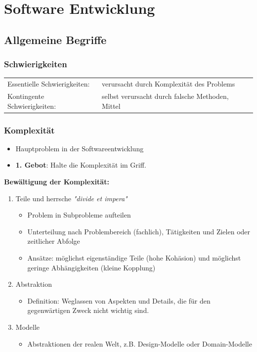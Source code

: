 \section{Software Entwicklung}

\subsection{Allgemeine Begriffe}
\subsubsection{Schwierigkeiten}
	\begin{tabular}{ll}
	Essentielle Schwierigkeiten: & verursacht durch Komplexität des Problems \\
	Kontingente Schwierigkeiten: & selbst verursacht durch falsche Methoden, Mittel\\
	\end{tabular}
	
\subsubsection{Komplexität}
	\begin{itemize}
		\item Hauptproblem in der Softwareentwicklung
		\item \textbf{1. Gebot}: Halte die Komplexität im Griff.
	\end{itemize}
	
	\textbf{Bewältigung der Komplexität:}
		\begin{enumerate}
			\item Teile und herrsche \textit{"divide et impera"}
					\begin{itemize}
						\item Problem in Subprobleme aufteilen
						\item Unterteilung nach Problembereich (fachlich), Tätigkeiten und Zielen oder zeitlicher Abfolge
						\item Ansätze: möglichst eigenständige Teile (hohe Kohäsion) und möglichst geringe Abhängigkeiten (kleine Kopplung)
					\end{itemize}
			\item Abstraktion
					\begin{itemize}
						\item Definition: Weglassen von Aspekten und Details, die für den gegenwärtigen Zweck nicht wichtig sind.
					\end{itemize}
			\item Modelle
					\begin{itemize}
						\item Abstraktionen der realen Welt, z.B. Design-Modelle oder Domain-Modelle
					\end{itemize}
		\end{enumerate}
	
